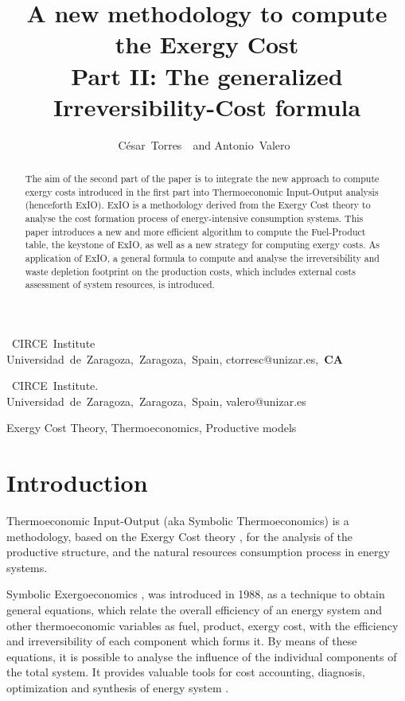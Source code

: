 \documentclass{ecos2018}
\title{A new methodology to compute the Exergy Cost\\ Part II: The generalized Irreversibility-Cost formula}
\author{%
      \mbox{C\'esar Torres \refauth{a}}~and
      \mbox{Antonio Valero \refauth{b}}}
\begin{document}
\maketitle

\begin{address}
 \mbox{ CIRCE Institute} \\
 \mbox{Universidad de Zaragoza, Zaragoza, Spain,}
 \mbox{ctorresc@unizar.es, \textbf{CA}} \par
 \mbox{ CIRCE Institute.} \\
 \mbox{Universidad de Zaragoza, Zaragoza, Spain,}
 \mbox{valero@unizar.es} \par
\end{address}

\begin{abstract}%
\begin{spacing}{1.1}
The aim of the second part of the paper is to integrate the new approach to compute exergy costs introduced in the first part into Thermoeconomic Input-Output analysis (henceforth ExIO). ExIO is a methodology derived from the Exergy Cost theory to analyse the cost formation process of energy-intensive
consumption systems. This paper introduces a new and more efficient algorithm to compute the Fuel-Product table, the keystone of ExIO, as well as a new strategy for computing exergy costs. 
As application of ExIO, a general formula to compute and analyse the irreversibility and waste depletion footprint on the production costs, which includes external costs assessment of system resources, is introduced.
\end{spacing}
\end{abstract}

\begin{keywords}
Exergy Cost Theory, Thermoeconomics, Productive models
\end{keywords}

\section{Introduction}
Thermoeconomic Input-Output (aka Symbolic Thermoeconomics) is a methodology, based on the \mbox{Exergy} Cost theory \cite{Torres2017}, for the analysis of the productive structure, and the natural resources consumption process in energy systems.

Symbolic Exergoeconomics \cite{Torres1988}, was introduced in 1988, as a technique to obtain general equations, which relate the overall efficiency of an energy system and other thermoeconomic variables as fuel, product, exergy cost, with the efficiency and irreversibility of each component which forms it. By means of these equations, it is possible to analyse the influence of the individual components of the total system. It provides valuable tools for cost accounting, diagnosis, optimization and synthesis of energy system \cite{TADEUS2004,ISE2010}.
\end{document}
